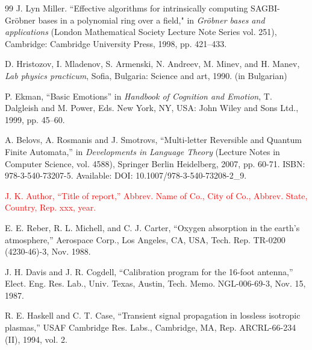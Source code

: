 \documentclass[11pt,a5paper,twoside]{article}
\begin{document}
\begin{thebibliography}{99}
J. Lyn Miller. ``Effective algorithms for intrinsically computing {SAGBI}-{G}r\"obner bases in a polynomial ring over a field," in \textit{Gr\"obner bases and applications} (London Mathematical Society Lecture Note Series vol. 251), Cambridge: Cambridge University Press, 1998, pp. 421--433.


 D. Hristozov, I. Mladenov, S. Armenski, N. Andreev, M. Minev, and H. Manev, \textit{Lab physics practicum}, Sofia, Bulgaria: Science and art, 1990. (in Bulgarian)


 P. Ekman, ``Basic Emotions'' in \textit{Handbook of Cognition and Emotion}, T. Dalgleish and M. Power, Eds. New York, NY, USA: John Wiley and Sons Ltd., 1999, pp. 45--60. 


 A. Belovs, A. Rosmanis and J. Smotrovs, ``Multi-letter Reversible and Quantum Finite Automata,'' in \textit{Developments in Language Theory }(Lecture Notes in Computer Science, vol. 4588), Springer Berlin Heidelberg, 2007, pp. 60-71. ISBN: 978-3-540-73207-5. 
Available: DOI: 10.1007/978-3-540-73208-2{\_}9.



 \textcolor{red}{
J. K. Author, ``Title of report,'' Abbrev. Name of Co., City of Co., 
Abbrev. State, Country, Rep. xxx, year.
}

 E. E. Reber, R. L. Michell, and C. J. Carter, ``Oxygen absorption in the earth's atmosphere,'' Aerospace Corp., Los Angeles, CA, USA, Tech. Rep. 
TR-0200 (4230-46)-3, Nov. 1988. 

 J. H. Davis and J. R. Cogdell, ``Calibration program for the 16-foot 
antenna,'' Elect. Eng. Res. Lab., Univ. Texas, Austin, Tech. Memo. 
NGL-006-69-3, Nov. 15, 1987. 

 R. E. Haskell and C. T. Case, ``Transient signal propagation in lossless isotropic plasmas,'' USAF Cambridge Res. Labs., Cambridge, MA, Rep. 
ARCRL-66-234 (II), 1994, vol. 2. 


\end{thebibliography}
\end{document}
